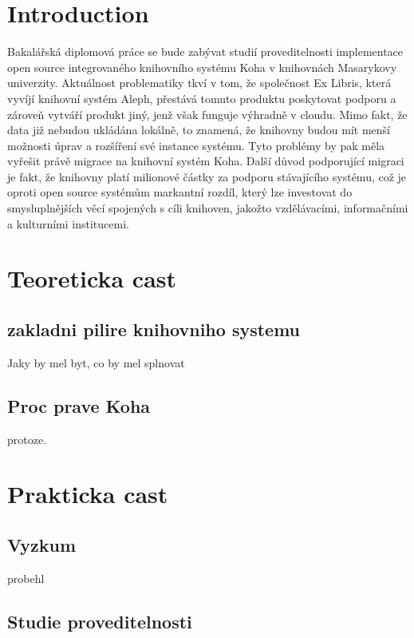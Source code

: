 \documentclass[
	12pt, oneside, printed, final, 
	table,   %
	lof,     %
	lot     %
]{fithesis3}
\begin{document}
\chapter{Introduction}

Bakalářská diplomová práce se bude zabývat studií proveditelnosti implementace 
open source integrovaného knihovního systému Koha v knihovnách Masarykovy univerzity. 
Aktuálnost problematiky tkví v tom, že společnost Ex Libris, která vyvíjí knihovní 
systém Aleph, přestává tomuto produktu poskytovat podporu a zároveň vytváří produkt jiný, 
jenž však funguje výhradně v cloudu. 
Mimo fakt, že data již nebudou ukládána lokálně, to znamená, že knihovny budou mít 
menší možnosti úprav a rozšíření své instance systému. Tyto problémy by pak měla 
vyřešit právě migrace na knihovní systém Koha. 
Další důvod podporující migraci je fakt, že knihovny platí milionové částky za 
podporu stávajícího systému, což je oproti open source systémům markantní rozdíl, 
který lze investovat do smysluplnějších  věcí spojených s cíli knihoven, 
jakožto vzdělávacími, informačními a kulturními institucemi. 

\chapter{Teoreticka cast }

\section{zakladni pilire knihovniho systemu}

Jaky by mel byt, co by mel splnovat

\section{Proc prave Koha}

protoze.

\chapter{Prakticka cast}

\section{Vyzkum}

probehl \cite{L36Hsi0FBbF4yvCA}

\section{Studie proveditelnosti}
\end{document}
